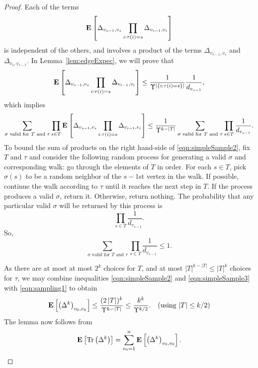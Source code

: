 \documentclass[11pt]{article}
\def\trace#1{\mathrm{Tr} \left(#1 \right)}
\def\expec#1#2{\mbox{\bf E}_{#1}\left[ #2 \right]}
\def\setof#1{\left\{#1  \right\}}
\def\sizeof#1{\left|#1  \right|}
\def\setof#1{\left\{#1  \right\}}
\begin{document}
\begin{proof}
Each of the terms
\[
  \expec{}{
    \Delta _{v_{s-1},v_{s}}
    \prod _{i : \tau(i) = s}
    \Delta _{v_{i-1},v_{i}}
}
\]
is independent of the others,
  and involves a product of the terms
  $\Delta _{v_{s-1},v_{s}}$
  and
  $\Delta _{v_{s},v_{s-1}}$.
In Lemma~\ref{lem:edgeExpec}, we will prove that
\begin{equation}\label{eqn:simpleSample}
    \expec{}{
    \Delta _{v_{s-1},v_{s}}
    \prod _{i : \tau(i) = s}
    \Delta _{v_{i-1},v_{i}}
  }
 \leq
   \frac{1}{\Upsilon ^{\sizeof{\setof{i : \tau (i) = s}}}}
  \frac{1}{d_{v_{s-1}}},
\end{equation}
which implies
\begin{equation}\label{eqn:simpleSample2}
  \sum _{\text{$\sigma$ valid for $T$ and $\tau $} }
  \prod _{s \in T}
  \expec{}{
    \Delta _{v_{s-1},v_{s}}
    \prod _{i : \tau(i) = s}
    \Delta _{v_{i-1},v_{i}}
  }
\leq
  \frac{1}{\Upsilon ^{k-\sizeof{T}}}
  \sum _{\text{$\sigma$ valid for $T$ and $\tau $} }
  \prod _{s \in T}
  \frac{1}{d_{v_{s-1}}}.
\end{equation}
To bound the sum of products on the right hand-side of
  \eqref{eqn:simpleSample2}, fix $T$ and $\tau$ and consider
  the following random process for generating a valid $\sigma$
  and corresponding walk:
  go through the elements of $T$ in order.
For each $s \in T$,
  pick $\sigma (s)$ to be a random neighbor of the $s-1$st vertex in the walk.
If possible, continue the walk according to $\tau$ until it reaches the next
  step in $T$.
If the process produces a valid $\sigma$, return it.
Otherwise, return nothing.
The probability that any particular valid $\sigma$ will be returned by this
  process is
\[
  \prod_{s \in T} \frac{1}{d_{v_{s-1}}}.
\]
So,
\begin{equation}\label{eqn:simpleSample3}
  \sum _{\text{$\sigma$ valid for $T$ and $\tau $} }
  \prod _{s \in T}
  \frac{1}{d_{v_{s-1}}}
\leq
  1.
\end{equation}

As there are at most
  at most $2^{k}$ choices for $T$,
  and at most $\sizeof{T}^{k-\sizeof{T}} \leq \sizeof{T}^k$ choices for $\tau $,
  we may combine inequalities \eqref{eqn:simpleSample2} and \eqref{eqn:simpleSample3} 
  with
  \eqref{eqn:sampling1} to obtain
\[
\expec{}{  \left(\Delta ^{k} \right)_{v_{0}, v_{k}}}
 \leq \frac{(2\sizeof{T})^{k}}{\Upsilon ^{k-\sizeof{T}}} \leq
  \frac{k^{k}}{\Upsilon ^{k/2}}. \quad \text{(using $\sizeof{T} \leq k/2$)}
\]
The lemma now follows from
\[
\expec{}{\trace{\Delta ^{k}}}
=
\sum_{v_{0}=1}^{n}\expec{}{  \left(\Delta ^{k} \right)_{v_{0}, v_{0}}}.
\]
\end{proof}
\end{document}
